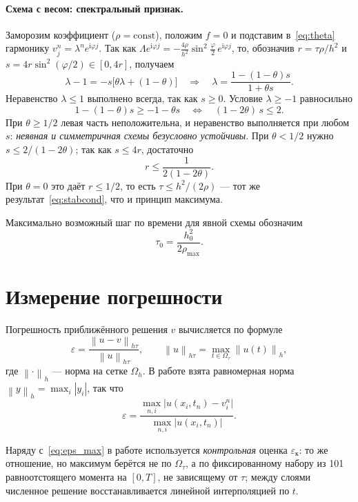 \documentclass[12pt,a4paper]{article}
\newcommand{\norm}[1]{\left\|#1\right\|}
\begin{document}
\paragraph{Схема с весом: спектральный признак.}
Заморозим коэффициент ($\rho=\mathrm{const}$), положим $f=0$ и подставим
в~\eqref{eq:theta} гармонику $v_j^n=\lambda^n e^{\mathrm{i}\varphi j}$.
Так как
$\Lambda e^{\mathrm{i}\varphi j}
=-\frac{4\rho}{h^2}\sin^2\frac\varphi2\,e^{\mathrm{i}\varphi j}$,
то, обозначив $r=\tau\rho/h^2$ и $s=4r\sin^2(\varphi/2)\in[0,4r]$,
получаем
\[
\lambda-1=-s\bigl[\theta\lambda+(1-\theta)\bigr]
\quad\Longrightarrow\quad
\lambda=\frac{1-(1-\theta)s}{1+\theta s}.
\]
Неравенство $\lambda\le1$ выполнено всегда, так как $s\ge0$. Условие
$\lambda\ge-1$ равносильно
\[
1-(1-\theta)s\ge-1-\theta s
\quad\Longleftrightarrow\quad
(1-2\theta)\,s\le2 .
\]
При $\theta\ge1/2$ левая часть неположительна, и неравенство выполняется
при любом $s$: \emph{неявная и симметричная схемы безусловно устойчивы}.
При $\theta<1/2$ нужно $s\le2/(1-2\theta)$; так как $s\le4r$, достаточно
\[
r\le\frac{1}{2(1-2\theta)} .
\]
При $\theta=0$ это даёт $r\le1/2$, то есть $\tau\le h^2/(2\rho)$ ---
тот же результат~\eqref{eq:stabcond}, что и принцип максимума.

Максимально возможный шаг по времени для явной схемы обозначим
\begin{equation}\label{eq:tau0}
\tau_0=\frac{h_0^2}{2\rho_{\max}} .
\end{equation}

\section{Измерение погрешности}

Погрешность приближённого решения $v$ вычисляется по формуле
\begin{equation}\label{eq:eps}
\varepsilon=\frac{\norm{u-v}_{h\tau}}{\norm{u}_{h\tau}},
\qquad
\norm{u}_{h\tau}=\max_{t\in\Omega_\tau}\norm{u(t)}_h ,
\end{equation}
где $\norm{\cdot}_h$ --- норма на сетке $\Omega_h$. В работе взята
равномерная норма $\norm{y}_h=\max_i|y_i|$, так что
\begin{equation}\label{eq:eps_max}
\varepsilon=\frac{\max_{n,i}\bigl|u(x_i,t_n)-v_i^n\bigr|}
                 {\max_{n,i}\bigl|u(x_i,t_n)\bigr|} .
\end{equation}

Наряду с~\eqref{eq:eps_max} в работе используется \emph{контрольная}
оценка $\varepsilon_{\text{к}}$: то же отношение, но максимум берётся не
по $\Omega_\tau$, а по фиксированному набору из 101 равноотстоящего
момента на $[0,T]$, не зависящему от $\tau$; между слоями численное
решение восстанавливается линейной интерполяцией по $t$.
\end{document}
